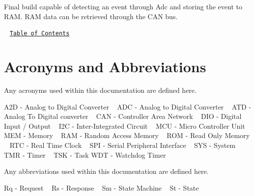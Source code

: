 Final build capable of detecting an event through Adc and storing the event to R\+A\+M. R\+A\+M data can be retrieved through the C\+A\+N bus.

~\newline
\href{#Contents}{\tt Table of Contents}~\newline
 



\label{_Acronyms}%
\hypertarget{index_Acronyms}{}\section{Acronyms and Abbreviations}\label{index_Acronyms}
Any acronyms used within this documentation are defined here.~\newline


A2\+D -\/ Analog to Digital Converter ~\newline
 A\+D\+C -\/ Analog to Digital Converter ~\newline
 A\+T\+D -\/ Analog To Digital converter ~\newline
 C\+A\+N -\/ Controller Area Network ~\newline
 D\+I\+O -\/ Digital Input / Output ~\newline
 I2\+C -\/ Inter-\/\+Integrated Circuit ~\newline
 M\+C\+U -\/ Micro Controller Unit ~\newline
 M\+E\+M -\/ Memory ~\newline
 R\+A\+M -\/ Random Access Memory ~\newline
 R\+O\+M -\/ Read Only Memory ~\newline
 R\+T\+C -\/ Real Time Clock ~\newline
 S\+P\+I -\/ Serial Peripheral Interface ~\newline
 S\+Y\+S -\/ System ~\newline
 T\+M\+R -\/ Timer ~\newline
 T\+S\+K -\/ Task W\+D\+T -\/ Watchdog Timer ~\newline
~\newline


Any abbreviations used within this documentation are defined here. ~\newline


Rq -\/ Request ~\newline
 Rs -\/ Response ~\newline
 Sm -\/ State Machine ~\newline
 St -\/ State ~\newline


